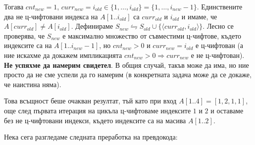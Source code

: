 \begin{solution}
\begin{maintenance}
\begin{mycase}
\begin{mycase}
				Тогава $cnt_{new}=1$, $curr_{new}=i_{old}\in\{1,\dots,i_{old}\}=\{1,\dots,i_{new}-1\}$. Единствените два не ц-чифтовани индекса на $A[1..i_{old}]$ са $curr_{old}$ и $i_{old}$ и имаме, че $A[curr_{old}]\ne A[i_{old}]$. Дефинираме $S_{new}\leftrightharpoons S_{old}\cup\{\langle curr_{old},i_{old}\rangle\}$. Лесно се проверява, че $S_{new}$ е максимално множество от съвместими ц-чифтове, където индексите са на $A[1..i_{new}-1]$, но $cnt_{new}>0$ и $curr_{new}=i_{old}$ е ц-чифтован (а ние искахме да докажем импликацията $cnt_{new}>0\Rightarrow curr_{new}$ е не ц-чифтован). \textbf{Не успяхме да намерим свидетел}. В общия случай, такъв може да има, но ние просто да не сме успели да го намерим (в конкретната задача може да се докаже, че наистина няма).
			\end{mycase}
		\end{mycase}
	Това всъщност беше очакван резултат, тъй като при вход $A[1..4]=[1,2,1,1]$, още след първата итерация на цикъла ц-чифтоваме индексите $1$ и $2$ и оставаме без не ц-чифтовани индекси, където индексите са на масива $A[1..2]$.
	\end{maintenance}

	\noindent
	Нека сега разгледаме следната преработка на превдокода:
	\begin{pseudocode}
				

\end{pseudocode}
\end{solution}
